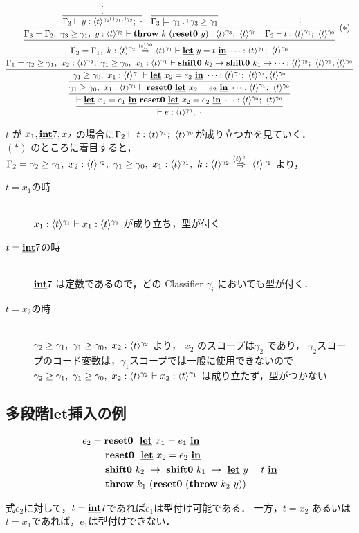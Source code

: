 \def\proofthree{
  {\infer{\Gamma_2=\Gamma_1,~k:\contT{\ttwo}{\tone}{\tzero}
      \vdash \cLet~y=t~\cIn~\cdots : \tone;~\tzero
    }
    {\prooffour}
  }
}

\def\prooffour{
  \infer{\Gamma_3=\Gamma_2,~\longer{\gamma_3}{\gamma_1},~y:\tthree \vdash \throw{k}{(\Resetz~ y)} :
    \tthree;~\tzero}
  {\infer{\Gamma_3 \vdash y : \tall;~\cdot}{\vdots}
    & \infer{\Gamma_3 \models \longer{\gamma_1\uni\gamma_3}{\gamma_1}}{}
  }
  & \infer[(*)]{\Gamma_2 \vdash t : \tone;~ \tzero}{\vdots}
}

\[
  \proofone
\]

$t$ が $x_1, \underline{\textbf{int}} 7, x_2$ の場合に$\Gamma_2 \vdash t : \langle{t}\rangle^{\gamma_1};~ \langle{t}\rangle^{\gamma_0}$が成り立つかを見ていく．\\
$(*)$ のところに着目すると，
$\Gamma_2 = {\gamma_2} \ge {\gamma_1},~x_2:\langle{t}\rangle^{\gamma_2},~{\gamma_1} \ge {\gamma_0},~x_1:\langle{t}\rangle^{\gamma_1},~k:{\langle{t}\rangle^{\gamma_2}} \stackrel{\langle{t}\rangle^{\gamma_0}}{\Rightarrow} {\langle{t}\rangle^{\gamma_1}}$
より，
\begin{description}
\item[$t=x_1$の時]\mbox{}\\
  $x_1:\langle{t}\rangle^{\gamma_1} \vdash x_1:\langle{t}\rangle^{\gamma_1}$ が成り立ち，型が付く
\item[$t= \underline{\textbf{int}} 7$の時]\mbox{}\\
  $\underline{\textbf{int}} 7$ は定数であるので，どの Classifier $\gamma_i$ においても型が付く．
\item[$t=x_2$の時]\mbox{}\\
  ${\gamma_2} \ge {\gamma_1},~{\gamma_1} \ge {\gamma_0},~x_2:\langle{t}\rangle^{\gamma_2}$ より，
  $x_2$ のスコープは$\gamma_2$ であり，
  $\gamma_2$スコープのコード変数は，$\gamma_1$スコープでは一般に使用できないので
  ${\gamma_2} \ge {\gamma_1},~{\gamma_1} \ge {\gamma_0},~x_2:\langle{t}\rangle^{\gamma_2} \vdash x_2:\langle{t}\rangle^{\gamma_1}$ は成り立たず，型がつかない
\end{description}

\subsection{多段階let挿入の例}

\begin{align*}
  e_2 & = \textbf{reset0} ~~\underline{\textbf{let}}~x_1= e_1~\underline{\textbf{in}} \\
      & \phantom{=}~~ \textbf{reset0} ~~\underline{\textbf{let}}~x_2=e_2~\underline{\textbf{in}} \\
      & \phantom{=}~~ \textbf{shift0}~k_2~\to~ \textbf{shift0}~k_1~\to~ \underline{\textbf{let}}~y=t~\underline{\textbf{in}} \\
      & \phantom{=}~~ \textbf{throw}~k_1~ (\textbf{reset0}~ (\textbf{throw}~k_2~ y))
\end{align*}

式$e_2$に対して，$t=\underline{\textbf{int}}7$であれば$e_1$は型付け可能である．
一方，$t=x_2$ あるいは $t=x_1$であれば，$e_1$は型付けできない．

